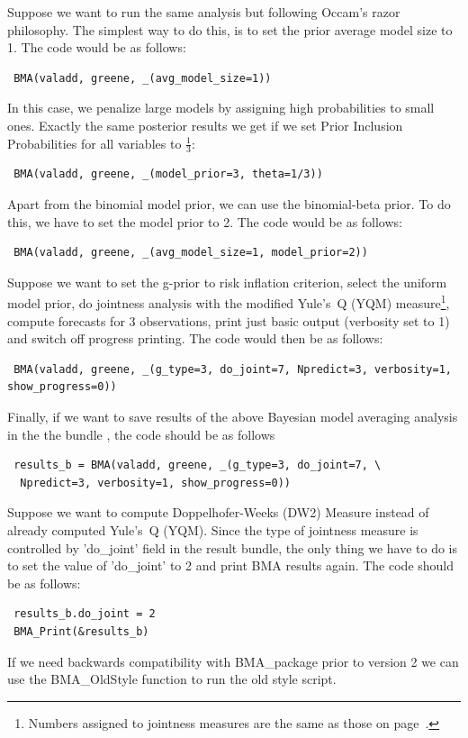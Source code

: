 Suppose we want to run the same analysis but following Occam's razor
philosophy.  The simplest way to do this, is to set the prior average
model size to 1.  The code would be as follows:
%
\begin{lstlisting}
 BMA(valadd, greene, _(avg_model_size=1))
\end{lstlisting}
%
In this case, we penalize large models by assigning high
probabilities to small ones. Exactly the same posterior results
we get if we set Prior Inclusion Probabilities for all
variables to $\frac{1}{3}$:
%
\begin{lstlisting}
 BMA(valadd, greene, _(model_prior=3, theta=1/3))
\end{lstlisting}
%
Apart from the binomial model prior, we can use the
binomial-beta prior. To do this, we have to set the model prior to 2.
The code would be as follows:
%
\begin{lstlisting}
 BMA(valadd, greene, _(avg_model_size=1, model_prior=2))
\end{lstlisting}
%
Suppose we want to set the g-prior to risk inflation criterion,
select the uniform model prior, do jointness analysis with the
modified Yule's~Q (YQM) measure\footnote{Numbers assigned to
	jointness measures are the same as those on
	page~\pageref{sec:jointess_numbers}.}, compute forecasts for 3
observations, print just basic output (verbosity set to 1) and
switch off progress printing. The code would then be as follows:
%
\begin{lstlisting}
 BMA(valadd, greene, _(g_type=3, do_joint=7, Npredict=3, verbosity=1, show_progress=0))
\end{lstlisting}
%
Finally, if we want to save results of the above Bayesian model
averaging analysis in the the bundle , the code
should be as follows
%
\begin{lstlisting}
 results_b = BMA(valadd, greene, _(g_type=3, do_joint=7, \
  Npredict=3, verbosity=1, show_progress=0))
\end{lstlisting}
%
Suppose we want to compute Doppelhofer-Weeks (DW2) Measure instead of
already computed Yule's~Q (YQM). Since the type of jointness measure
is controlled by 'do\_joint' field in the result bundle, the only thing
we have to do is to set the value of 'do\_joint' to 2 and print BMA
results again. The code should be as follows:

\begin{lstlisting}
 results_b.do_joint = 2
 BMA_Print(&results_b)
\end{lstlisting}
%
If we need backwards compatibility with BMA\_package prior to version 2
we can use the BMA\_OldStyle function to run the old style script.

